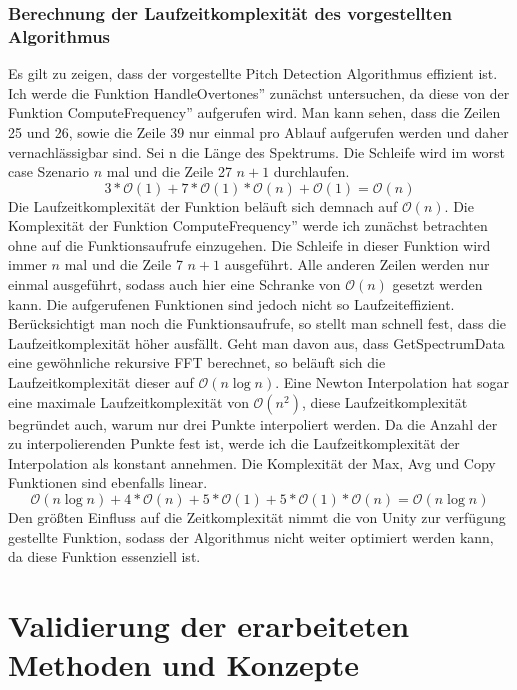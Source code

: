 \subsection*{Berechnung der Laufzeitkomplexität des vorgestellten Algorithmus}
Es gilt zu zeigen, dass der vorgestellte Pitch Detection Algorithmus effizient ist. Ich werde die Funktion \glqq HandleOvertones'' zunächst untersuchen, da diese von der Funktion \glqq ComputeFrequency'' aufgerufen wird. Man kann sehen, dass die Zeilen 25 und 26, sowie die Zeile 39 nur einmal pro Ablauf aufgerufen werden und daher vernachlässigbar sind. Sei n die Länge des Spektrums. Die Schleife wird im worst case Szenario $n$ mal und die Zeile 27 $n + 1$ durchlaufen. 
$$3 * \mathcal{O}(1) + 7 * \mathcal{O}(1) * \mathcal{O}(n) + \mathcal{O}(1) = \mathcal{O}(n) $$
Die Laufzeitkomplexität der Funktion beläuft sich demnach auf $\mathcal{O}(n)$. Die Komplexität der Funktion \glqq ComputeFrequency'' werde ich zunächst betrachten ohne auf die Funktionsaufrufe einzugehen. Die Schleife in dieser Funktion wird immer $n$ mal und die Zeile 7 $n + 1$ ausgeführt. Alle anderen Zeilen werden nur einmal ausgeführt, sodass auch hier eine Schranke von $\mathcal{O}(n)$ gesetzt werden kann. Die aufgerufenen Funktionen sind jedoch nicht so Laufzeiteffizient. Berücksichtigt man noch die Funktionsaufrufe, so stellt man schnell fest, dass die Laufzeitkomplexität höher ausfällt. Geht man davon aus, dass GetSpectrumData eine gewöhnliche rekursive FFT berechnet, so beläuft sich die Laufzeitkomplexität dieser auf $\mathcal{O}(n \log{n})$. Eine Newton Interpolation hat sogar eine maximale Laufzeitkomplexität von $\mathcal{O}(n^2)$, diese Laufzeitkomplexität begründet auch, warum nur drei Punkte interpoliert werden. Da die Anzahl der zu interpolierenden Punkte fest ist, werde ich die Laufzeitkomplexität der Interpolation als konstant annehmen. Die Komplexität der Max, Avg und Copy Funktionen sind ebenfalls linear.
$$\mathcal{O}(n \log{n}) + 4 * \mathcal{O}(n) + 5 * \mathcal{O}(1) + 5 * \mathcal{O}(1) * \mathcal{O}(n) = \mathcal{O}(n \log{n})$$
Den größten Einfluss auf die Zeitkomplexität nimmt die von Unity zur verfügung gestellte Funktion, sodass der Algorithmus nicht weiter optimiert werden kann, da diese Funktion essenziell ist.



\chapter{Validierung der erarbeiteten Methoden und Konzepte}

